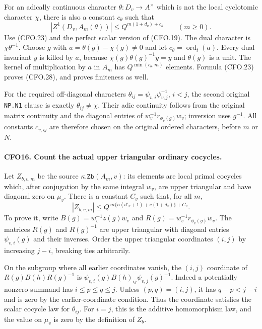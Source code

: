 For an adically continuous character
$\theta:D_v\to A^\times$ which is not the local
cyclotomic character $\chi$, there is also a constant
$c_\theta$ such that
\[
 |Z^1(D_v,A_m(\theta))|
       \le Q^{m(1+d_v)+c_\theta}\qquad(m\ge0).                   \tag{CFO.28}
\]
Use (CFO.23) and the perfect scalar version of (CFO.19).
The dual character is $\chi\theta^{-1}$.  Choose $g$ with
$a=\theta(g)-\chi(g)\ne0$ and let
$c_\theta=\operatorname{ord}_t(a)$.  Every dual invariant
$y$ is killed by $a$, because
$\chi(g)\theta(g)^{-1}y=y$ and $\theta(g)$ is a unit.
The kernel of multiplication by $a$ in $A_m$ has
$Q^{\min(c_\theta,m)}$ elements.  Formula (CFO.23) proves
(CFO.28), and proves finiteness as well.

For the required off-diagonal characters
$\theta_{ij}=\psi_{v,i}\psi_{v,j}^{-1}$, $i<j$, the
second original \texttt{NP.N1} clause is exactly
$\theta_{ij}\ne\chi$.  Their adic continuity follows from
the original matrix continuity and the diagonal entries
of $w_v^{-1}r_{\phi_v(g)}w_v$; inversion uses $g^{-1}$.
All constants $c_{v,ij}$ are therefore chosen on the
original ordered characters, before $m$ or $N$.

\paragraph{CFO16. Count the actual upper triangular ordinary cocycles.}
\label{claim:CFO16}
Let $Z_{b,v,m}$ be the source $\kappa.\texttt{Zb}(A_m,v)$:
its elements are local primal cocycles which, after
conjugation by the same integral $w_v$, are upper
triangular and have diagonal zero on $\mu_v$.  There is
a constant $C_v$ such that, for all $m$,
\[
 |Z_{b,v,m}|\le
 Q^{\,m\{n(d'_v+1)+\nu(1+d_v)\}+C_v}.                           \tag{CFO.29}
\]
To prove it, write $B(g)=w_v^{-1}z(g)w_v$ and
$R(g)=w_v^{-1}r_{\phi_v(g)}w_v$.  The matrices $R(g)$ and
$R(g)^{-1}$ are upper triangular with diagonal entries
$\psi_{v,i}(g)$ and their inverses.  Order the upper
triangular coordinates $(i,j)$ by increasing $j-i$,
breaking ties arbitrarily.

On the subgroup where all earlier coordinates vanish,
the $(i,j)$ coordinate of
$R(g)B(h)R(g)^{-1}$ is
$\psi_{v,i}(g)B(h)_{ij}\psi_{v,j}(g)^{-1}$.
Indeed a potentially nonzero summand has
$i\le p\le q\le j$.  Unless $(p,q)=(i,j)$, it has
$q-p<j-i$ and is zero by the earlier-coordinate condition.
Thus the coordinate satisfies the scalar cocycle law
for $\theta_{ij}$.
For $i=j$, this is the additive homomorphism law, and
the value on $\mu_v$ is zero by the definition of $Z_b$.

